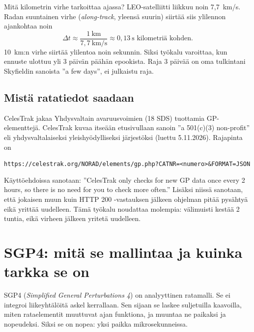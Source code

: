 \documentclass[a4paper,11pt]{article}
\newcommand{\koodi}[1]{\texttt{#1}}
\begin{document}
Mitä kilometrin virhe tarkoittaa ajassa? LEO-satelliitti liikkuu noin 7,7~km/s. Radan suuntainen virhe (\emph{along-track}, yleensä suurin) siirtää siis ylilennon ajankohtaa noin
\[
\Delta t \approx \frac{1\ \text{km}}{7,7\ \text{km/s}} \approx 0,13\ \text{s kilometriä kohden}.
\]
10~km:n virhe siirtää ylilentoa noin sekunnin. Siksi työkalu varoittaa, kun ennuste ulottuu yli 3 päivän päähän epookista. Raja 3 päivää on oma tulkintani Skyfieldin sanoista ”a few days”, ei julkaistu raja.

\subsection{Mistä ratatiedot saadaan}

CelesTrak jakaa Yhdysvaltain avaruusvoimien (18 SDS) tuottamia GP-elementtejä. CelesTrak
kuvaa itseään etusivullaan sanoin ”a 501(c)(3) non-profit” eli yhdysvaltalaiseksi
yleishyödylliseksi järjestöksi (luettu 5.11.2026). Rajapinta on
\begin{center}
\small\koodi{https://celestrak.org/NORAD/elements/gp.php?CATNR=<numero>\&FORMAT=JSON}
\end{center}
Käyttöehdoissa sanotaan: ”CelesTrak only checks for new GP data once every 2 hours, so there is no need for you to check more often.” Lisäksi niissä sanotaan, että jokaisen muun kuin HTTP 200 -vastauksen jälkeen ohjelman pitää pysähtyä eikä yrittää uudelleen. Tämä työkalu noudattaa molempia: välimuisti kestää 2 tuntia, eikä virheen jälkeen yritetä uudelleen.

\section{SGP4: mitä se mallintaa ja kuinka tarkka se on}\label{sec:sgp4}

SGP4 (\emph{Simplified General Perturbations 4}) on analyyttinen ratamalli. Se ei integroi liikeyhtälöitä askel kerrallaan. Sen sijaan se laskee suljetuilla kaavoilla, miten rataelementit muuttuvat ajan funktiona, ja muuntaa ne paikaksi ja nopeudeksi. Siksi se on nopea: yksi paikka mikrosekunneissa.
\end{document}
